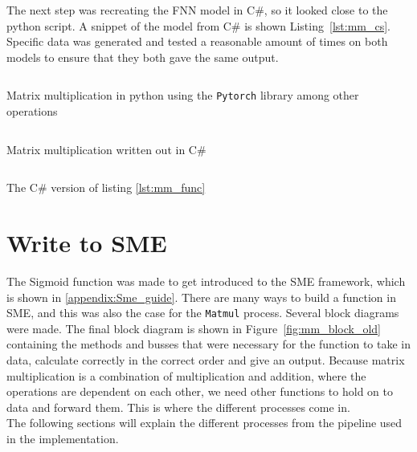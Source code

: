 The next step was recreating the FNN model in C\#, so it looked close to the python script. 
A snippet of the model from C\# is shown Listing~\ref{lst:mm_cs}.
Specific data was generated and tested a reasonable amount of times on both models to ensure that they both gave the same output. %

\begin{listing}
  \inputminted{python}{codesnippets/mm.py}
  \caption{Matrix multiplication in python using the \texttt{Pytorch} library among other operations }
  \label{lst:mm}
\end{listing}

\begin{listing}
  \inputminted{csharp}{codesnippets/mm_func.cs}
  \caption{Matrix multiplication written out in C\# }
  \label{lst:mm_func}
\end{listing}

\begin{listing}
  \inputminted{csharp}{codesnippets/mm.cs}
  \caption{The C\# version of listing \ref{lst:mm_func}}
  \label{lst:mm_cs}
\end{listing}

\section{Write to SME}
The Sigmoid function was made to get introduced to the SME framework, which is shown in \ref{appendix:Sme_guide}. There are many ways to build a function in SME, and this was also the case for the \texttt{Matmul} process. Several block diagrams were made. The final block diagram is shown in Figure~\ref{fig:mm_block_old} containing the methods and busses that were necessary for the function to take in data, calculate correctly in the correct order and give an output. Because matrix multiplication is a combination of multiplication and addition, where the operations are dependent on each other, we need other functions to hold on to data and forward them. This is where the different processes come in. \\
The following sections will explain the different processes from the pipeline used in the implementation.


